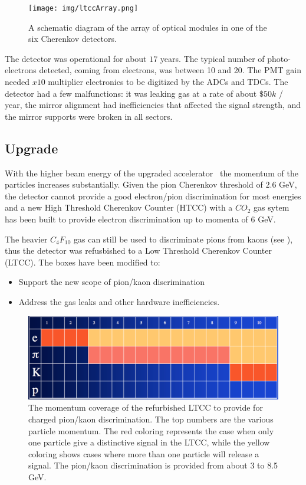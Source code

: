 \begin{figure}
	\centering
	\texttt{[image: img/ltccArray.png]}
	\caption{A schematic diagram of the array of optical modules in one of the six Cherenkov detectors.}
	\label{fig:ltccArray}
\end{figure}

The detector was operational for about $17$ years. The typical number of photo-electrons detected, coming from electrons, was between 10 and 20.
The PMT gain needed $x10$ multiplier electronics to be digitized by the ADCs and TDCs.
The detector had a few malfunctions: it was leaking gas at a rate of about $\$50k$ / year, the mirror alignment had inefficiencies that affected
the signal strength, and the mirror supports were broken in all sectors.


\subsection{Upgrade}

With the higher beam energy of the upgraded accelerator~\cite{TDR12} the momentum of the particles increases substantially.
Given the pion Cherenkov threshold of $2.6$ GeV, the detector cannot provide a good electron/pion discrimination for most energies and a new
High Threshold Cherenkov Counter (HTCC) with a $CO_2$ gas sytem has been built to provide electron discrimination up to momenta of $6$ GeV.

The heavier $C_4F_{10}$ gas can still be used to discriminate pions from kaons (see ), thus the detector was refusbished
to a Low Threshold Cherenkov Counter (LTCC).
The boxes have been modified to:

\begin{itemize}
	\item Support the new scope of pion/kaon discrimination
	\item Address the gas leaks and other hardware inefficiencies.
\end{itemize}

\begin{figure}
	\centering
	\includegraphics[width=1.0\columnwidth,keepaspectratio]{img/newScope.png}
	\caption{The momentum coverage of the refurbished LTCC to provide for charged pion/kaon discrimination. The top numbers are the various particle momentum.
				The red coloring represents the case when only one particle give a distinctive signal in the LTCC, while the yellow coloring shows cases
            where more than one particle will release a signal. The pion/kaon discrimination is provided from about 3 to 8.5 GeV.}
	\label{fig:newScope}
\end{figure}
